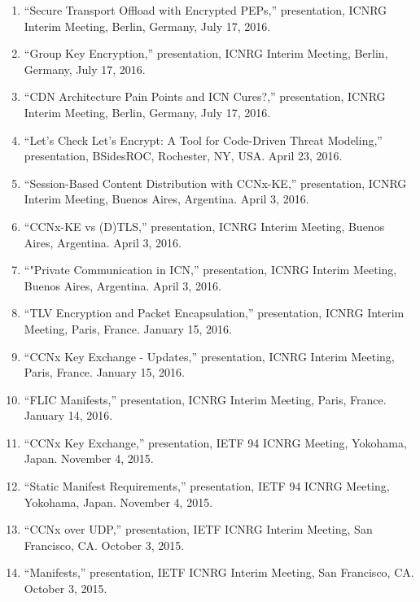 \documentclass[10pt]{res} %
\begin{document}
\begin{resume}
\begin{enumerate}[T-1.]
\item ``Secure Transport Offload with Encrypted PEPs,'' presentation, ICNRG Interim Meeting, Berlin, Germany, July 17, 2016.

\item ``Group Key Encryption,'' presentation, ICNRG Interim Meeting, Berlin, Germany, July 17, 2016.

\item ``CDN Architecture Pain Points and ICN Cures?,'' presentation, ICNRG Interim Meeting, Berlin, Germany, July 17, 2016.

\item ``Let's Check Let's Encrypt: A Tool for Code-Driven Threat Modeling,'' presentation, BSidesROC, Rochester, NY, USA. April 23, 2016.

\item ``Session-Based Content Distribution with CCNx-KE,'' presentation, ICNRG Interim Meeting, Buenos Aires, Argentina. April 3, 2016.

\item ``CCNx-KE vs (D)TLS,'' presentation, ICNRG Interim Meeting, Buenos Aires, Argentina. April 3, 2016.

\item ``"Private Communication in ICN,'' presentation, ICNRG Interim Meeting, Buenos Aires, Argentina. April 3, 2016.

\item ``TLV Encryption and Packet Encapsulation,'' presentation, ICNRG Interim Meeting, Paris, France. January 15, 2016.

\item ``CCNx Key Exchange - Updates,'' presentation, ICNRG Interim Meeting, Paris, France. January 15, 2016.

\item ``FLIC Manifests,'' presentation, ICNRG Interim Meeting, Paris, France. January 14, 2016.

\item ``CCNx Key Exchange,'' presentation, IETF 94 ICNRG Meeting, Yokohama, Japan. November 4, 2015.

\item ``Static Manifest Requirements,'' presentation, IETF 94 ICNRG Meeting, Yokohama, Japan. November 4, 2015.

\item ``CCNx over UDP,'' presentation, IETF ICNRG Interim Meeting, San Francisco, CA. October 3, 2015.

\item ``Manifests,'' presentation, IETF ICNRG Interim Meeting, San Francisco, CA. October 3, 2015.


\end{enumerate}
\end{resume}
\end{document}

